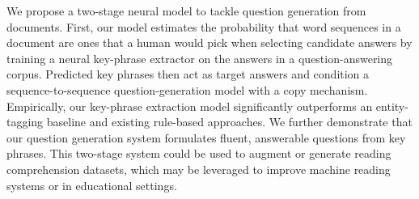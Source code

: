 We propose a two-stage neural model to tackle question generation from documents. First, our model estimates the probability that word sequences in a document are ones that a human would pick when selecting candidate answers by training a neural key-phrase extractor on the answers in a question-answering corpus. Predicted key phrases then act as target answers and condition a sequence-to-sequence question-generation model with a copy mechanism. Empirically, our key-phrase extraction model significantly outperforms an entity-tagging baseline and existing rule-based approaches. We further demonstrate that our question generation system formulates fluent, answerable questions from key phrases. This two-stage system could be used to augment or generate reading comprehension datasets, which may be leveraged to improve machine reading systems or in educational settings.
